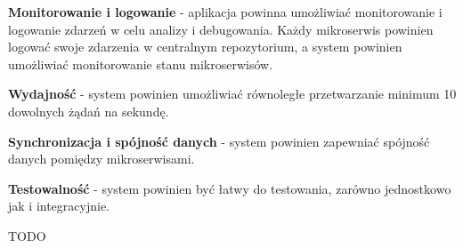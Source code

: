 \textbf{Monitorowanie i logowanie} - aplikacja powinna umożliwiać monitorowanie i logowanie zdarzeń w celu analizy i debugowania. Każdy mikroserwis powinien logować swoje zdarzenia w centralnym repozytorium, a system powinien umożliwiać monitorowanie stanu mikroserwisów.

\textbf{Wydajność} - system powinien umożliwiać równoległe przetwarzanie minimum 10 dowolnych żądań na sekundę.

\textbf{Synchronizacja i spójność danych} - system powinien zapewniać spójność danych pomiędzy mikroserwisami.
    
\textbf{Testowalność} - system powinien być łatwy do testowania, zarówno jednostkowo jak i integracyjnie.

TODO